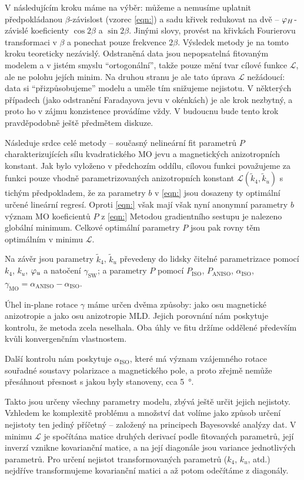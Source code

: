 V následujícím kroku máme na výběr: můžeme a nemusíme uplatnit předpokládanou $\beta$-závislost (vzorec \eqref{eqn:}) a sadu křivek redukovat na dvě -- $\varphi_H$-závislé koeficienty $\cos2\beta$ a $\sin2\beta$.
Jinými slovy, provést na křivkách Fourierovu transformaci v $\beta$ a ponechat pouze frekvence $2\beta$.
Výsledek metody je na tomto kroku teoreticky nezávislý.
Odstraněná data jsou nepopsatelná fitovaným modelem a v jistém smyslu ``ortogonální'', takže pouze mění tvar cílové funkce $\mathcal{L}$, ale ne polohu jejích minim.
Na druhou stranu je ale tato úprava $\mathcal{L}$ nežádoucí: data si ``přizpůsobujeme'' modelu a uměle tím snižujeme nejistotu.
V některých případech (jako odstranění Faradayova jevu v okénkách) je ale krok nezbytný, a proto ho v zájmu konzistence provádíme vždy.
V budoucnu bude tento krok pravděpodobně ještě předmětem diskuze.

Následuje srdce celé metody -- současný nelineární fit parametrů $P$ charakterizujících sílu kvadratického MO jevu a magnetických anizotropních konstant.
Jak bylo vyloženo v předchozím oddílu, cílovou funkci považujeme za funkci pouze vhodně parametrizovaných anizotropních konstant $\mathcal{L}(\tilde{k}_4, \tilde{k}_u)$ s tichým předpokladem, že za parametry $b$ v \eqref{eqn:} jsou dosazeny ty optimální určené lineární regresí.
Oproti \eqref{eqn:} však mají však nyní anonymní parametry $b$ význam MO koeficientů $P$ z \eqref{eqn:}
Metodou gradientního sestupu je nalezeno globální minimum.
Celkové optimální parametry $P$ jsou pak rovny těm optimálním v minimu $\mathcal{L}$.

Na závěr jsou parametry $\tilde{k}_4$, $\tilde{k}_u$ převedeny do lidsky čitelné parametrizace pomocí $k_4$, $k_u$, $\varphi_u$ a natočení $\gamma_\textrm{SW}$; a parametry $P$ pomocí $P_\textrm{ISO}$, $P_\textrm{ANISO}$, $\alpha_\textrm{ISO}$, $\gamma_\textrm{MO}=\alpha_\textrm{ANISO}-\alpha_\textrm{ISO}$.

Úhel in-plane rotace $\gamma$ máme určen dvěma způsoby: jako osu magnetické anizotropie a jako osu anizotropie MLD.
Jejich porovnání nám poskytuje kontrolu, že metoda zcela neselhala.
Oba úhly ve fitu držíme oddělené především kvůli konvergenčním vlastnostem.

Další kontrolu nám poskytuje $\alpha_\textrm{ISO}$, které má význam vzájemného rotace souřadné soustavy polarizace a magnetického pole, a proto zřejmě nemůže přesáhnout přesnost s jakou byly stanoveny, cca \SI{5}{\degree}.

Takto jsou určeny všechny parametry modelu, zbývá ještě určit jejich nejistoty.
Vzhledem ke komplexitě problému a množství dat volíme jako způsob určení nejistoty ten jediný příčetný -- založený na principech Bayesovské analýzy dat\cite{gelmanBayesianDataAnalysis2014}.
V minimu $\mathcal{L}$ je spočítána matice druhých derivací podle fitovaných parametrů, její inverzí vznikne kovarianční matice, a na její diagonále jsou variance jednotlivých parametrů.
Pro určení nejistot transformovaných parametrů ($k_4$, $k_u$, atd.) nejdříve transformujeme kovarianční matici a až potom odečítáme z diagonály.
